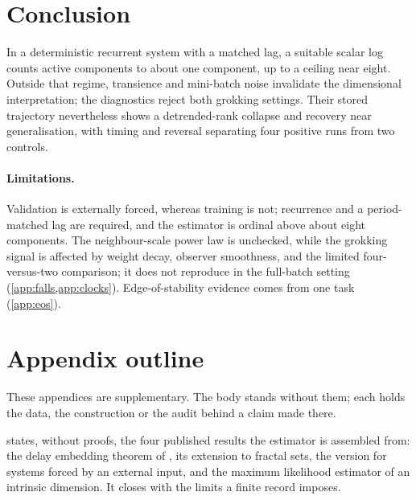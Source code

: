 \documentclass[twoside]{article}
\newenvironment{claude}{\color{claudecolor}}{}
\begin{document}
\section{Conclusion}\label{sec:concl}

In a deterministic recurrent system with a matched lag, a suitable scalar log counts active
components to about one component, up to a ceiling near eight. Outside that regime, transience and
mini-batch noise invalidate the dimensional interpretation; the diagnostics reject both grokking
settings. Their stored trajectory nevertheless shows a detrended-rank collapse and recovery near
generalisation, with timing and reversal separating four positive runs from two controls.
\begin{claude}
\paragraph{Limitations.} Validation is externally forced, whereas training is not; recurrence and a
period-matched lag are required, and the estimator is ordinal above about eight components. The
neighbour-scale power law is unchecked, while the grokking signal is affected by weight decay,
observer smoothness, and the limited four-versus-two comparison; it does not reproduce in the
full-batch setting (\cref{app:falls,app:clocks}). Edge-of-stability evidence comes from one task
(\cref{app:eos}).
\end{claude}




\appendix
{}

\section*{Appendix outline}

These appendices are supplementary. The body stands without them; each holds the data, the
construction or the audit behind a claim made there.

\textbf{} states, without proofs, the four published results the estimator is
assembled from: the delay embedding theorem of \citet{takens1981detecting}, its extension to fractal sets, the version for systems
forced by an external input, and the maximum likelihood
estimator of an intrinsic dimension. It closes with the limits a finite record imposes.
\end{document}
